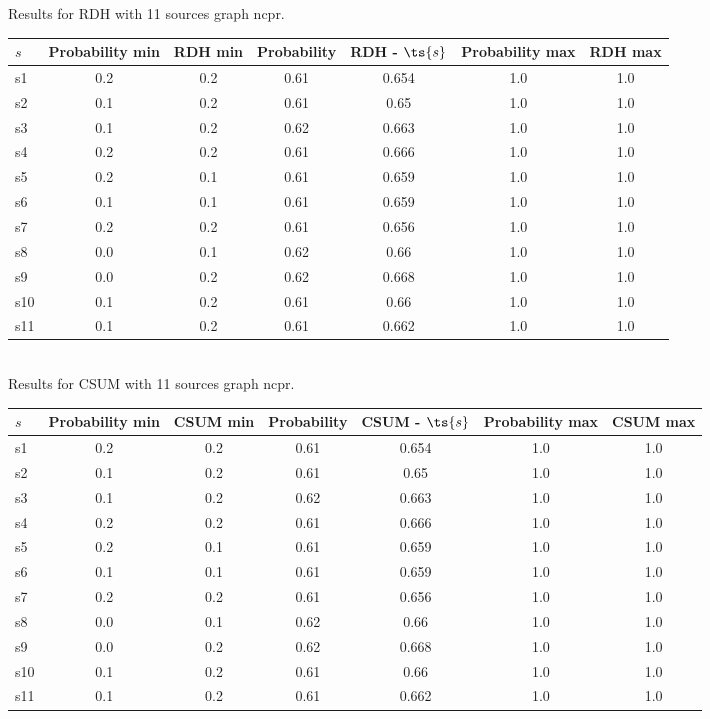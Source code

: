 \documentclass{article}
\begin{document}
\noindent Results for RDH with 11 sources graph ncpr.

\noindent\begin{tabular}{|l|c|c|c|c|c|c|}
\hline
$s$& Probability min & RDH min & Probability & RDH - $\ts{s}$ & Probability max & RDH max\\
\hline
s1 &0.2 & 0.2 & 0.61 & 0.654 & 1.0 & 1.0\\
\hline
s2 &0.1 & 0.2 & 0.61 & 0.65 & 1.0 & 1.0\\
\hline
s3 &0.1 & 0.2 & 0.62 & 0.663 & 1.0 & 1.0\\
\hline
s4 &0.2 & 0.2 & 0.61 & 0.666 & 1.0 & 1.0\\
\hline
s5 &0.2 & 0.1 & 0.61 & 0.659 & 1.0 & 1.0\\
\hline
s6 &0.1 & 0.1 & 0.61 & 0.659 & 1.0 & 1.0\\
\hline
s7 &0.2 & 0.2 & 0.61 & 0.656 & 1.0 & 1.0\\
\hline
s8 &0.0 & 0.1 & 0.62 & 0.66 & 1.0 & 1.0\\
\hline
s9 &0.0 & 0.2 & 0.62 & 0.668 & 1.0 & 1.0\\
\hline
s10 &0.1 & 0.2 & 0.61 & 0.66 & 1.0 & 1.0\\
\hline
s11 &0.1 & 0.2 & 0.61 & 0.662 & 1.0 & 1.0\\
\hline
\end{tabular}\\

\noindent Results for CSUM with 11 sources graph ncpr.

\noindent\begin{tabular}{|l|c|c|c|c|c|c|}
\hline
$s$& Probability min & CSUM min & Probability & CSUM - $\ts{s}$ & Probability max & CSUM max\\
\hline
s1 &0.2 & 0.2 & 0.61 & 0.654 & 1.0 & 1.0\\
\hline
s2 &0.1 & 0.2 & 0.61 & 0.65 & 1.0 & 1.0\\
\hline
s3 &0.1 & 0.2 & 0.62 & 0.663 & 1.0 & 1.0\\
\hline
s4 &0.2 & 0.2 & 0.61 & 0.666 & 1.0 & 1.0\\
\hline
s5 &0.2 & 0.1 & 0.61 & 0.659 & 1.0 & 1.0\\
\hline
s6 &0.1 & 0.1 & 0.61 & 0.659 & 1.0 & 1.0\\
\hline
s7 &0.2 & 0.2 & 0.61 & 0.656 & 1.0 & 1.0\\
\hline
s8 &0.0 & 0.1 & 0.62 & 0.66 & 1.0 & 1.0\\
\hline
s9 &0.0 & 0.2 & 0.62 & 0.668 & 1.0 & 1.0\\
\hline
s10 &0.1 & 0.2 & 0.61 & 0.66 & 1.0 & 1.0\\
\hline
s11 &0.1 & 0.2 & 0.61 & 0.662 & 1.0 & 1.0\\
\hline
\end{tabular}\\
\end{document}
